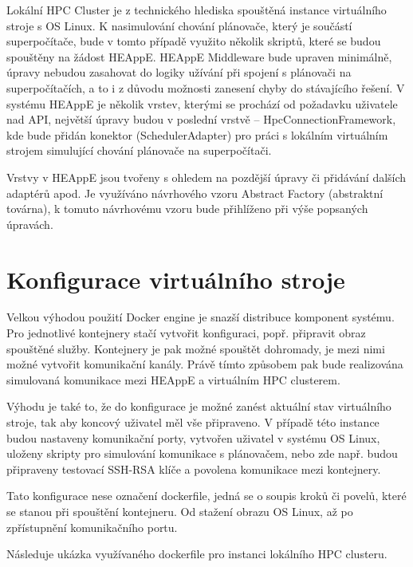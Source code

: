 Lokální HPC Cluster je z technického hlediska spouštěná instance virtuálního stroje s OS Linux. K nasimulování chování plánovače, který je součástí superpočítače, bude v tomto případě využito několik skriptů, které se budou spouštěny na žádost HEAppE. HEAppE Middleware bude upraven minimálně, úpravy nebudou zasahovat do logiky užívání při spojení s plánovači na superpočítačích, a to i z důvodu možnosti zanesení chyby do stávajícího řešení. V systému HEAppE je několik vrstev, kterými se prochází od požadavku uživatele nad API, největší úpravy budou v poslední vrstvě – HpcConnectionFramework, kde bude přidán konektor (SchedulerAdapter) pro práci s lokálním virtuálním strojem simulující chování plánovače na superpočítači.

Vrstvy v HEAppE jsou tvořeny s ohledem na pozdější úpravy či přidávání dalších adaptérů apod. Je využíváno návrhového vzoru Abstract Factory (abstraktní továrna), k tomuto návrhovému vzoru bude přihlíženo při výše popsaných úpravách.

\section{Konfigurace virtuálního stroje}
Velkou výhodou použití Docker engine je snazší distribuce komponent systému. Pro jednotlivé kontejnery stačí vytvořit konfiguraci, popř. připravit obraz spouštěné služby. Kontejnery je pak možné spouštět dohromady, je mezi nimi možné vytvořit komunikační kanály. Právě tímto způsobem pak bude realizována simulovaná komunikace mezi HEAppE a virtuálním HPC clusterem.

Výhodu je také to, že do konfigurace je možné zanést aktuální stav virtuálního stroje, tak aby koncový uživatel měl vše připraveno. V případě této instance budou nastaveny komunikační porty, vytvořen uživatel v systému OS Linux, uloženy skripty pro simulování komunikace s plánovačem, nebo zde např. budou připraveny testovací SSH-RSA klíče a povolena komunikace mezi kontejnery.

Tato konfigurace nese označení dockerfile, jedná se o soupis kroků či povelů, které se stanou při spouštění kontejneru. Od stažení obrazu OS Linux, až po zpřístupnění komunikačního portu.

Následuje ukázka využívaného dockerfile pro instanci lokálního HPC clusteru.

\hfill \break


